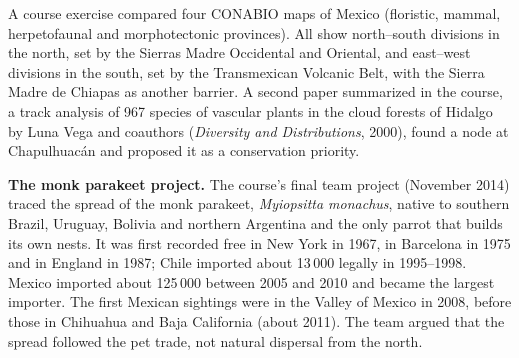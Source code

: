 A course exercise compared four
CONABIO maps of Mexico (floristic,
mammal, herpetofaunal and morphotectonic
provinces). All show north--south
divisions in the north, set by the Sierras
Madre Occidental and Oriental, and
east--west divisions in the south, set by
the Transmexican Volcanic Belt, with the
Sierra Madre de Chiapas as another
barrier. A second paper summarized in the
course, a track analysis of 967 species of
vascular plants in the cloud forests of
Hidalgo by Luna Vega and coauthors
(\emph{Diversity and Distributions},
2000), found a node at Chapulhuac\'an and
proposed it as a conservation priority.

\textbf{The monk parakeet project.} The
course's final team project (November
2014) traced the spread of the monk
parakeet, \emph{Myiopsitta monachus},
native to southern Brazil, Uruguay,
Bolivia and northern Argentina and the
only parrot that builds its own nests.
It was first recorded free in New York in
1967, in Barcelona in 1975 and in England
in 1987; Chile imported about 13\,000
legally in 1995--1998. Mexico imported
about 125\,000 between 2005 and 2010 and
became the largest importer. The first
Mexican sightings were in the Valley of
Mexico in 2008, before those in Chihuahua
and Baja California (about 2011). The team
argued that the spread followed the pet
trade, not natural dispersal from the
north.






